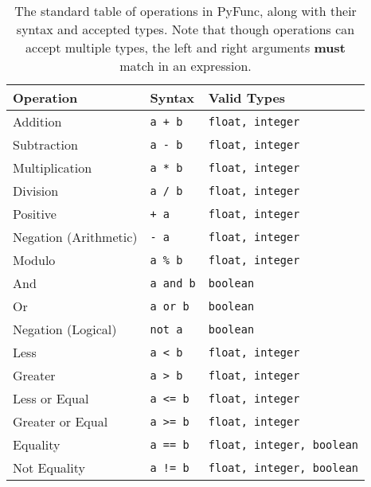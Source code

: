 \documentclass{l4proj}
\begin{document}
\begin{table}[h!]
    \caption{The standard table of operations in PyFunc, along with their syntax and accepted types. Note that though operations can accept multiple types, the left and right arguments \textbf{must} match in an expression.}\label{tab:operators}
    \begin{center}
    \begin{tabular}{@{}|l|l|l|@{}}
    \hline
    \textbf{Operation}    & \textbf{Syntax}       &   \textbf{Valid Types}    \\ %
    \hline
    Addition              & \texttt{a + b}        &   \texttt{float, integer} \\
    Subtraction           & \texttt{a - b}        &   \texttt{float, integer} \\
    Multiplication        & \texttt{a * b}        &   \texttt{float, integer} \\
    Division              & \texttt{a / b}        &   \texttt{float, integer} \\
    Positive              & \texttt{+ a}          &   \texttt{float, integer} \\
    Negation (Arithmetic) & \texttt{- a}          &   \texttt{float, integer} \\
    Modulo                & \texttt{a \% b}       &   \texttt{float, integer} \\
    And                   & \texttt{a and b}      &   \texttt{boolean}        \\
    Or                    & \texttt{a or b}       &   \texttt{boolean}        \\
    Negation (Logical)    & \texttt{not a}        &   \texttt{boolean}        \\
    Less                  & \texttt{a < b}        &   \texttt{float, integer} \\
    Greater               & \texttt{a > b}        &   \texttt{float, integer} \\
    Less or Equal         & \texttt{a <= b}       &   \texttt{float, integer} \\
    Greater or Equal      & \texttt{a >= b}       &   \texttt{float, integer} \\
    Equality              & \texttt{a == b}       &   \texttt{float, integer, boolean} \\
    Not Equality          & \texttt{a != b}       &   \texttt{float, integer, boolean} \\

\end{tabular}
\end{center}
\end{table}
\end{document}
